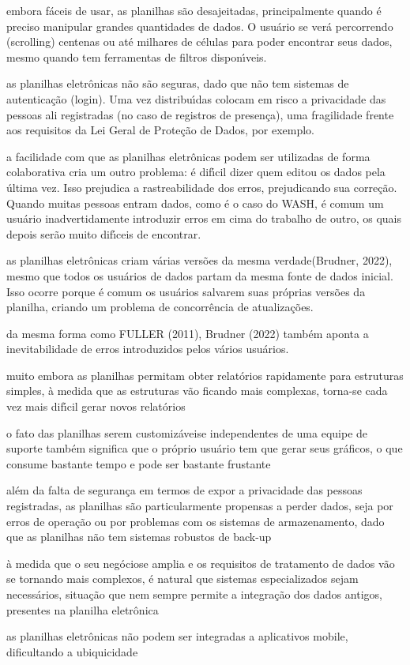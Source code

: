 \documentclass[
12pt,		%
openright,	%
twoside,  %
a4paper,			%
chapter=TITLE,		%
english,			%
french,				%
spanish,			%
brazil				%
]{USPSC-classe/USPSC_RedarTex}
\begin{document}
\begin{alineas}
\item embora f\'aceis de usar, as planilhas s\~ao desajeitadas, principalmente quando \'e preciso manipular grandes quantidades de dados. O usu\'ario se ver\'a percorrendo (scrolling) centenas ou at\'e milhares de c\'elulas para poder encontrar seus dados, mesmo quando tem ferramentas de filtros dispon\'{\i}veis.
\item as planilhas eletr\^onicas n\~ao s\~ao seguras, dado que n\~ao tem sistemas de autentica\c{c}\~ao (login). Uma vez distribu\'{\i}das colocam em risco a privacidade das pessoas ali registradas (no caso de registros de presen\c{c}a), uma fragilidade frente aos requisitos da Lei Geral de Prote\c{c}\~ao de Dados, por exemplo.
\item a facilidade com que as planilhas eletr\^onicas podem ser utilizadas de forma colaborativa cria um outro problema: \'e dif\'{\i}cil dizer quem editou os dados pela \'ultima vez. Isso prejudica a rastreabilidade dos erros, prejudicando sua corre\c{c}\~ao. Quando muitas pessoas entram dados, como \'e o caso do WASH, \'e comum um usu\'ario inadvertidamente introduzir erros em cima do trabalho de outro, os quais depois ser\~ao muito dif\'{\i}ceis de encontrar.
\item as planilhas eletr\^onicas criam v\'arias vers\~oes da mesma \textquotedbl verdade\textquotedbl   (Brudner, 2022), mesmo que todos os usu\'arios de dados partam da mesma fonte de dados inicial. Isso ocorre porque \'e comum os usu\'arios salvarem suas pr\'oprias vers\~oes da planilha, criando um problema de concorr\^encia de atualiza\c{c}\~oes.
\item da mesma forma como  FULLER (2011),  Brudner (2022) tamb\'em aponta a inevitabilidade de erros introduzidos pelos v\'arios usu\'arios.
\item muito embora as planilhas permitam obter relat\'orios rapidamente para estruturas simples, \`a medida que as estruturas v\~ao ficando mais complexas, torna-se cada vez mais dif\'{\i}cil gerar novos relat\'orios
\item o fato das planilhas serem \textquotedbl customiz\'aveis\textquotedbl  e independentes de uma equipe de suporte tamb\'em significa que o pr\'oprio usu\'ario tem que gerar seus gr\'aficos, o que consume bastante tempo e pode ser bastante frustante
\item al\'em da falta de seguran\c{c}a em termos de expor a privacidade das pessoas registradas, as planilhas s\~ao particularmente propensas a perder dados, seja por erros de opera\c{c}\~ao ou por problemas com os sistemas de armazenamento, dado que as planilhas n\~ao tem sistemas robustos de \textquotedbl back-up\textquotedbl 
\item \`a medida que o seu \textquotedbl neg\'ocio\textquotedbl  se amplia e os requisitos de tratamento de dados v\~ao se tornando mais complexos, \'e natural que sistemas especializados sejam necess\'arios, situa\c{c}\~ao que nem sempre permite a integra\c{c}\~ao dos dados antigos, presentes na planilha eletr\^onica
\item as planilhas eletr\^onicas n\~ao podem ser integradas a aplicativos mobile, dificultando a ubiquicidade
\end{alineas}
\end{document}
